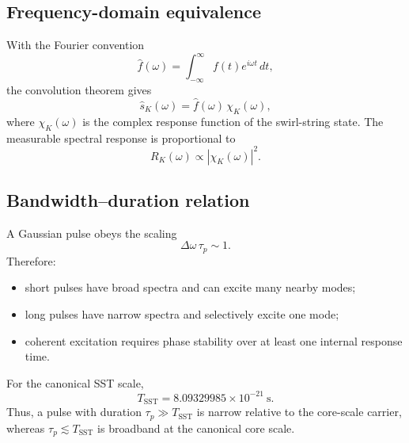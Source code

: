     \subsection*{Frequency-domain equivalence}
        
        With the Fourier convention
        \[
            \hat f(\omega)
            =
            \int_{-\infty}^{\infty}
            f(t)e^{i\omega t}\,dt,
        \]
        the convolution theorem gives
        \begin{equation}
            \hat s_K(\omega)
            =
            \hat f(\omega)\,\chi_K(\omega),
            \label{eq:frequency_response_chi}
        \end{equation}
        where \(\chi_K(\omega)\) is the complex response function of the swirl-string state. The measurable spectral response is proportional to
        \begin{equation}
            R_K(\omega)
            \propto
            |\chi_K(\omega)|^2.
            \label{eq:response_modulus}
        \end{equation}
    
    \subsection*{Bandwidth--duration relation}
        
        A Gaussian pulse obeys the scaling
        \begin{equation}
            \Delta\omega\,\tau_p \sim 1.
            \label{eq:time_bandwidth_relation}
        \end{equation}
        Therefore:
        \begin{itemize}
            \item short pulses have broad spectra and can excite many nearby modes;
            \item long pulses have narrow spectra and selectively excite one mode;
            \item coherent excitation requires phase stability over at least one internal response time.
        \end{itemize}
        
        For the canonical SST scale,
        \[
            T_{\mathrm{SST}} = 8.09329985\times10^{-21}\ \mathrm{s}.
        \]
        Thus, a pulse with duration \(\tau_p\gg T_{\mathrm{SST}}\) is narrow relative to the core-scale carrier, whereas \(\tau_p\lesssim T_{\mathrm{SST}}\) is broadband at the canonical core scale.
    
